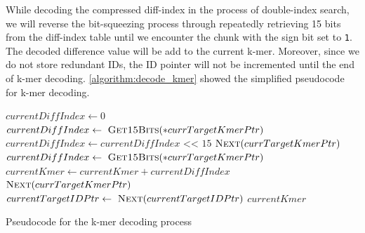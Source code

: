 While decoding the compressed diff-index in the process of double-index search, we will reverse the bit-squeezing process through repeatedly retrieving 15 bits from the diff-index table until we encounter the chunk with the sign bit set to \texttt{1}. The decoded difference value will be add to the current k-mer. Moreover, since we do not store redundant IDs, the ID pointer will not be incremented until the end of k-mer decoding. \cref{algorithm:decode_kmer} showed the simplified pseudocode for k-mer decoding.

\begin{algorithm}[htbp]
  \begin{algorithmic}

  \State $currentDiffIndex \gets 0$\;
    \State $currentDiffIndex \gets\ \textsc{Get15Bits}(*currTargetKmerPtr)$
    \State $currentDiffIndex \gets currentDiffIndex \texttt{ << } 15$
    \State $\textsc{Next}(currTargetKmerPtr)$
  \EndWhile
  \State $currentDiffIndex \gets\ \textsc{Get15Bits}(*currTargetKmerPtr)$
  \State $currentKmer \gets currentKmer + currentDiffIndex$
  \State $\textsc{Next}(currTargetKmerPtr)$
  \State $currentTargetIDPtr \gets\ \textsc{Next}(currentTargetIDPtr)$
  \Return $currentKmer$
  \EndProcedure
  \caption{ Pseudocode for the k-mer decoding process} \label{algorithm:decode_kmer}
  \end{algorithmic}
\end{algorithm}


